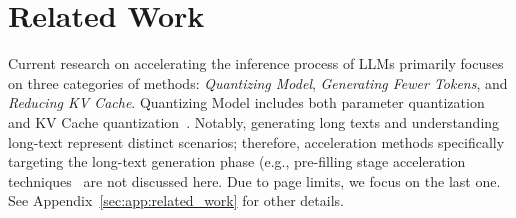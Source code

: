 \section{Related Work}

Current research on accelerating the inference process of LLMs primarily focuses on three categories of methods: \textit{Quantizing Model}, \textit{Generating Fewer Tokens}, and \textit{Reducing KV Cache}. 
Quantizing Model includes both parameter quantization~\cite{mlsys24_awq} and KV Cache quantization~\citep{icml24_kivi}. 
Notably, generating long texts and understanding long-text represent distinct 
scenarios; 
therefore, acceleration methods specifically targeting the long-text generation phase (e.g., pre-filling stage acceleration techniques~\citep{emnlp23_autocompressors,iclr24_icae,emnlp23_llmlingua,iclr25_activation_beacon,nips24_snapkv,arxiv24_pyramidkv} are not discussed here. 
Due to page limits, we focus on the last one. 
See Appendix~\ref{sec:app:related_work} for other details.


